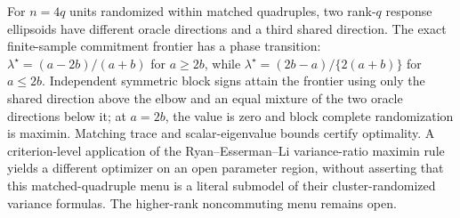 For \(n=4q\) units randomized within matched quadruples, two rank-\(q\) response ellipsoids have different oracle directions and a third shared direction. The exact finite-sample commitment frontier has a phase transition: \(\lambda^\star=(a-2b)/(a+b)\) for \(a\ge2b\), while \(\lambda^\star=(2b-a)/\{2(a+b)\}\) for \(a\le2b\). Independent symmetric block signs attain the frontier using only the shared direction above the elbow and an equal mixture of the two oracle directions below it; at \(a=2b\), the value is zero and block complete randomization is maximin. Matching trace and scalar-eigenvalue bounds certify optimality. A criterion-level application of the Ryan--Esserman--Li variance-ratio maximin rule yields a different optimizer on an open parameter region, without asserting that this matched-quadruple menu is a literal submodel of their cluster-randomized variance formulas. The higher-rank noncommuting menu remains open.